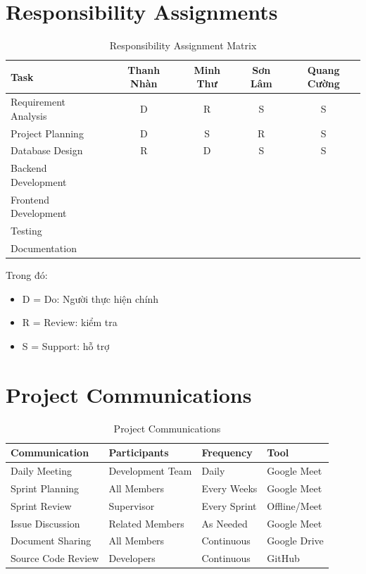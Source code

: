 \section{Responsibility Assignments}

\begin{table}[H]
	\centering
	\small
	\caption{Responsibility Assignment Matrix}
	\begin{tabularx}{\textwidth}{|Y|c|c|c|c|}
		\hline
		\textbf{Task} &
		\textbf{Thanh Nhàn} &
		\textbf{Minh Thư} &
		\textbf{Sơn Lâm} &
		\textbf{Quang Cường} \\ \hline
		
		Requirement Analysis & D & R & S & S \\ \hline
		Project Planning & D & S & R & S \\ \hline
		Database Design & R & D & S & S \\ \hline
		Backend Development & & & & \\ \hline
		Frontend Development & & & & \\ \hline
		Testing & & & & \\ \hline
		Documentation & & & & \\ \hline
		
	\end{tabularx}
\end{table}

Trong đó:

\begin{itemize}
	\item D = Do: Người thực hiện chính
	\item R = Review: kiểm tra
	\item S = Support: hỗ trợ
\end{itemize}


\section{Project Communications}

\begin{table}[H]
	\centering
	\small
	\caption{Project Communications}
	\begin{tabularx}{\textwidth}{|Y|Y|L{2.5cm}|Y|}
		\hline
		\textbf{Communication} &
		\textbf{Participants} &
		\textbf{Frequency} &
		\textbf{Tool} \\ \hline
		
		Daily Meeting & Development Team & Daily & Google Meet \\ \hline
		Sprint Planning & All Members & Every Weeks & Google Meet \\ \hline
		Sprint Review & Supervisor & Every Sprint & Offline/Meet \\ \hline
		Issue Discussion & Related Members & As Needed & Google Meet \\ \hline
		Document Sharing & All Members & Continuous & Google Drive \\ \hline
		Source Code Review & Developers & Continuous & GitHub \\ \hline
		
	\end{tabularx}
\end{table}


